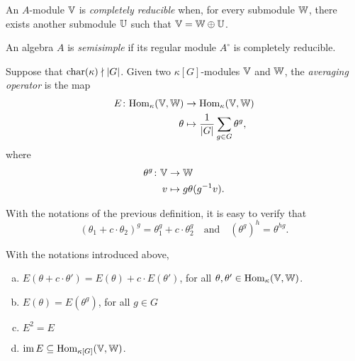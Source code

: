 \begin{defn}
    An\/ $A$-module $\mathbb V$ is \textsl{completely reducible} when, for every submodule\/ $\mathbb W$, there exists another submodule\/ $\mathbb U$ such that\/ $\mathbb V = \mathbb W \oplus\mathbb U$.
\end{defn}

\begin{defn}
    An algebra\/ $A$ is \textsl{semisimple} if its regular module $A^\circ$ is completely reducible.
\end{defn}

\begin{defn}\label{defn:averaging-operator}
    Suppose that $\operatorname{char}(\kappa)\nmid|G|$. Given two $\kappa[G]$-modules $\mathbb V$ and $\mathbb W$, the \textsl{averaging operator} is the map
    \begin{align*}
        E\colon{\rm Hom}_\kappa(\mathbb V,\mathbb W)&\to{\rm Hom}_\kappa(\mathbb V,\mathbb W)\\
        \theta&\mapsto\frac1{|G|}\sum_{g\in G}\theta^g,
    \end{align*}
    where
    \begin{align*}
        \theta^g\colon\mathbb V&\to\mathbb W\\
        v&\mapsto g\theta(g^{-1}v).
    \end{align*}
\end{defn}

\begin{rem}\label{rem:conjugate-linearity}
    With the notations of the previous definition, it is easy to verify that
        \begin{equation}\label{eq:conjugate-linearity}
            (\theta_1+c\cdot\theta_2)^g
                =\theta_1^g+c\cdot\theta_2^g
            \quad\mathrm{and}\quad
            (\theta^g)^h = \theta^{hg}.
        \end{equation}
\end{rem}

\begin{lem}\label{lem:E-properties}
    With the notations introduced above,
    \begin{enumerate}[a),font=\upshape]
        \item $E(\theta+c\cdot\theta')=E(\theta)+c\cdot E(\theta')$, for all\/ $\theta,\theta'\in{\rm Hom}_\kappa(\mathbb V,\mathbb W)$.

        \item $E(\theta)=E(\theta^g)$, for all\/ $g\in G$

        \item $E^2=E$

        \item $\operatorname{im}E\subseteq{\rm Hom}_{\kappa[G]}(\mathbb V,\mathbb W)$.
    \end{enumerate}
\end{lem}

